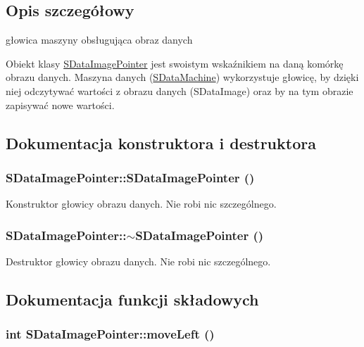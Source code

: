 \subsection{Opis szczegółowy}
głowica maszyny obsługująca obraz danych 

Obiekt klasy \hyperlink{classSDataImagePointer}{SDataImagePointer} jest swoistym wskaźnikiem na daną komórkę obrazu danych. Maszyna danych (\hyperlink{classSDataMachine}{SDataMachine}) wykorzystuje głowicę, by dzięki niej odczytywać wartości z obrazu danych (SDataImage) oraz by na tym obrazie zapisywać nowe wartości. 

\subsection{Dokumentacja konstruktora i destruktora}
\hypertarget{classSDataImagePointer_2ffb42e886f442004cd21617a6ea034d}{
\subsubsection[{SDataImagePointer}]{\setlength{\rightskip}{0pt plus 5cm}SDataImagePointer::SDataImagePointer ()}}
\label{classSDataImagePointer_2ffb42e886f442004cd21617a6ea034d}


Konstruktor głowicy obrazu danych. Nie robi nic szczególnego. \hypertarget{classSDataImagePointer_8f96c4dc8dc25e0ff5cccb2e693ffcc8}{
\subsubsection[{$\sim$SDataImagePointer}]{\setlength{\rightskip}{0pt plus 5cm}SDataImagePointer::$\sim$SDataImagePointer ()}}
\label{classSDataImagePointer_8f96c4dc8dc25e0ff5cccb2e693ffcc8}


Destruktor głowicy obrazu danych. Nie robi nic szczególnego. 

\subsection{Dokumentacja funkcji składowych}
\hypertarget{classSDataImagePointer_87bb92d4bb0336b4723c64d03df9987c}{
\subsubsection[{moveLeft}]{\setlength{\rightskip}{0pt plus 5cm}int SDataImagePointer::moveLeft ()}}
\label{classSDataImagePointer_87bb92d4bb0336b4723c64d03df9987c}


